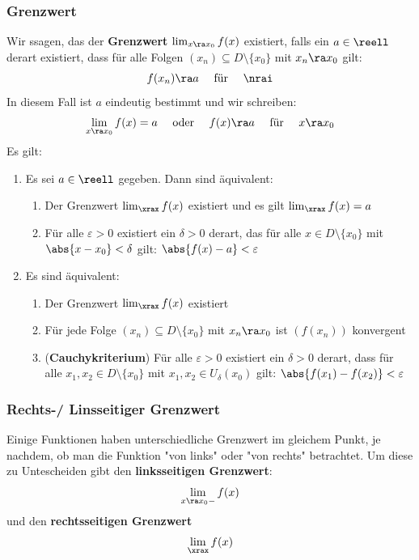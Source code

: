\documentclass{kit}
\begin{document}
    \subsubsection{Grenzwert}
      Wir ssagen, das der \textbf{Grenzwert} $\lim_{x\ra x_0}f(x)$ existiert, falls ein $a\in\reell$ derart existiert, dass für alle Folgen $(x_n)\subseteq D\setminus\{x_0\}$ mit $x_n\ra x_0$ gilt:
      $$f(x_n)\ra a\quad\text{ für }\quad \nrai$$
      In diesem Fall ist $a$ eindeutig bestimmt und wir schreiben:
      $$\lim_{x\ra x_0}f(x)=a\quad\text{ oder }\quad f(x)\ra a\quad\text{ für }\quad x\ra x_0$$
      Es gilt:
      \begin{enumerate}
        \item Es sei $a\in\reell$ gegeben. Dann sind äquivalent:
          \begin{enumerate}[label=\roman*)]
            \item Der Grenzwert $\lim_\xrax f(x)$ existiert und es gilt $\lim_\xrax f(x)=a$
            \item Für alle $\varepsilon>0$ existiert ein $\delta>0$ derart, das für alle $x\in D\setminus\{x_0\}$ mit $\abs{x-x_0}<\delta$ gilt: $\abs{f(x)-a}<\varepsilon$
          \end{enumerate}
        \item Es sind äquivalent:
          \begin{enumerate}[label=\roman*)]
            \item Der Grenzwert $\lim_\xrax f(x)$ existiert
            \item Für jede Folge $(x_n)\subseteq D\setminus\{x_0\}$ mit $x_n\ra x_0$ ist $(f(x_n))$ konvergent
            \item (\textbf{Cauchykriterium}) Für alle $\varepsilon>0$ existiert ein $\delta>0$ derart, dass für alle $x_1,x_2\in D\setminus\{x_0\}$ mit $x_1,x_2\in U_\delta(x_0)$ gilt: $\abs{f(x_1)-f(x_2)}<\varepsilon$
          \end{enumerate}
      \end{enumerate}
    \subsubsection{Rechts-/ Linsseitiger Grenzwert}
      Einige Funktionen haben unterschiedliche Grenzwert im gleichem Punkt, je nachdem, ob man die Funktion "von links" oder "von rechts" betrachtet. Um diese zu Untescheiden gibt den \textbf{linksseitigen Grenzwert}:
      $$\lim_{x\ra x_0-}f(x)$$
      und den \textbf{rechtsseitigen Grenzwert}
      $$\lim_\xrax f(x)$$
\end{document}
